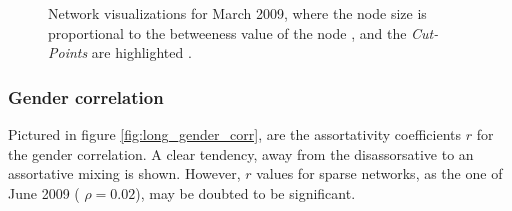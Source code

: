 \begin{figure}[htpb]%
	\centering 
	
	\qquad 			
	\caption[Network visualizations for March 2009]{Network visualizations for March 2009, where the node size is proportional to the betweeness value of the node , and the \textit{Cut-Points} are highlighted .}
	 \label{fig:graphs_march}
\end{figure} 


\subsubsection{Gender correlation}

Pictured in figure \ref{fig:long_gender_corr}, are the assortativity coefficients $r$ for the gender correlation. A clear tendency, away from the disassorsative to an assortative mixing is shown. However, $r$ values for sparse networks, as the one of June 2009 ( $\rho = 0.02$), may be doubted to be significant.

